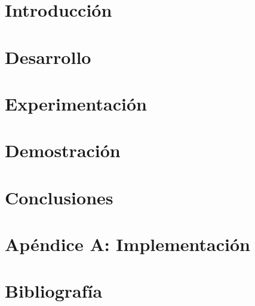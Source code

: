 \documentclass[10pt, a4paper]{article}
\begin{document}
\maketitle

\tableofcontents

\pagestyle{fancy}

\clearpage
\section{Introducción}
  

\clearpage
\section{Desarrollo}
  

\clearpage
\section{Experimentación}
  

\clearpage
\section{Demostración}
  

\section{Conclusiones}
  
 

\clearpage
\section{Apéndice A: Implementación}
    
\clearpage
\section{Bibliografía}
    
\end{document}
